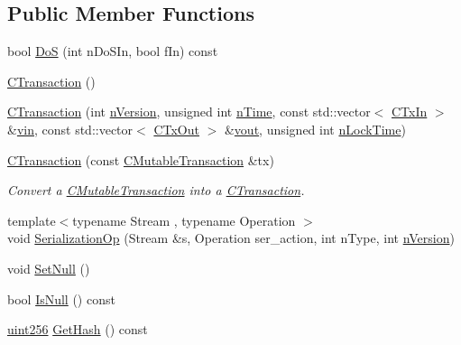 \subsection*{Public Member Functions}
\begin{DoxyCompactItemize}
\item 
bool \hyperlink{class_c_transaction_a52eaee52d8827b7265f9dcd308b2a812}{Do\+S} (int n\+Do\+S\+In, bool f\+In) const 
\item 
\hyperlink{class_c_transaction_a41717180530fca69eb0163c1024ae286}{C\+Transaction} ()
\item 
\hyperlink{class_c_transaction_a6f91dd80b9f92ce99185d55b59dbce13}{C\+Transaction} (int \hyperlink{class_c_transaction_a6c29bdd822859c7b21b7b6c22dca6825}{n\+Version}, unsigned int \hyperlink{class_c_transaction_a8ccb4b6020669bc562095e3417715e41}{n\+Time}, const std\+::vector$<$ \hyperlink{class_c_tx_in}{C\+Tx\+In} $>$ \&\hyperlink{class_c_transaction_a53fa787e4ea57374b4fa2a28e9a957b2}{vin}, const std\+::vector$<$ \hyperlink{class_c_tx_out}{C\+Tx\+Out} $>$ \&\hyperlink{class_c_transaction_ae42c0032a464c3054c508017c7d040ef}{vout}, unsigned int \hyperlink{class_c_transaction_ab01e4e451d2f3f84b01380979c8fdacc}{n\+Lock\+Time})
\item 
\hyperlink{class_c_transaction_a6607e95af3e2851ee3b7fe335a05eb4c}{C\+Transaction} (const \hyperlink{struct_c_mutable_transaction}{C\+Mutable\+Transaction} \&tx)
\begin{DoxyCompactList}\small\item\em Convert a \hyperlink{struct_c_mutable_transaction}{C\+Mutable\+Transaction} into a \hyperlink{class_c_transaction}{C\+Transaction}. \end{DoxyCompactList}\item 
{\footnotesize template$<$typename Stream , typename Operation $>$ }\\void \hyperlink{class_c_transaction_aa79659fab1e973a058494393209b0a59}{Serialization\+Op} (Stream \&s, Operation ser\+\_\+action, int n\+Type, int \hyperlink{class_c_transaction_a6c29bdd822859c7b21b7b6c22dca6825}{n\+Version})
\item 
void \hyperlink{class_c_transaction_a1aa7a38971e9c045b12a3efab67647e9}{Set\+Null} ()
\item 
bool \hyperlink{class_c_transaction_af2f0fe5a8853ea2928f77b97581031a6}{Is\+Null} () const 
\item 
\hyperlink{classuint256}{uint256} \hyperlink{class_c_transaction_a3f8666d2a275c40da14bd5eaf47dc004}{Get\+Hash} () const 
\item 

\end{DoxyCompactItemize}
